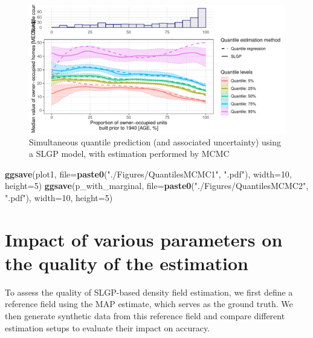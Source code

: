 \documentclass[
]{article}
\newenvironment{Shaded}{\begin{snugshade}}{\end{snugshade}}
\newcommand{\AttributeTok}[1]{\textcolor[rgb]{0.13,0.29,0.53}{#1}}
\newcommand{\DecValTok}[1]{\textcolor[rgb]{0.00,0.00,0.81}{#1}}
\newcommand{\FunctionTok}[1]{\textcolor[rgb]{0.13,0.29,0.53}{\textbf{#1}}}
\newcommand{\NormalTok}[1]{#1}
\newcommand{\StringTok}[1]{\textcolor[rgb]{0.31,0.60,0.02}{#1}}
\begin{document}
\begin{figure}[H]

{\centering \includegraphics{IntroductionSLGP_files/figure-latex/SLGPMCMCplotQuantiles2-1} 

}

\caption{Simultaneous quantile prediction (and associated uncertainty) using a SLGP model, with estimation performed by MCMC}\label{fig:SLGPMCMCplotQuantiles2}
\end{figure}

\begin{Shaded}
\begin{Highlighting}[]
\FunctionTok{ggsave}\NormalTok{(plot1, }\AttributeTok{file=}\FunctionTok{paste0}\NormalTok{(}\StringTok{"./Figures/QuantilesMCMC1"}\NormalTok{,  }\StringTok{".pdf"}\NormalTok{), }\AttributeTok{width=}\DecValTok{10}\NormalTok{, }\AttributeTok{height=}\DecValTok{5}\NormalTok{)}
\FunctionTok{ggsave}\NormalTok{(p\_with\_marginal, }\AttributeTok{file=}\FunctionTok{paste0}\NormalTok{(}\StringTok{"./Figures/QuantilesMCMC2"}\NormalTok{,  }\StringTok{".pdf"}\NormalTok{), }\AttributeTok{width=}\DecValTok{10}\NormalTok{, }\AttributeTok{height=}\DecValTok{5}\NormalTok{)}
\end{Highlighting}
\end{Shaded}

\section{Impact of various parameters on the quality of the estimation}\label{impact-of-various-parameters-on-the-quality-of-the-estimation}

To assess the quality of SLGP-based density field estimation, we first define a reference field using the MAP estimate, which serves as the ground truth. We then generate synthetic data from this reference field and compare different estimation setups to evaluate their impact on accuracy.
\end{document}
